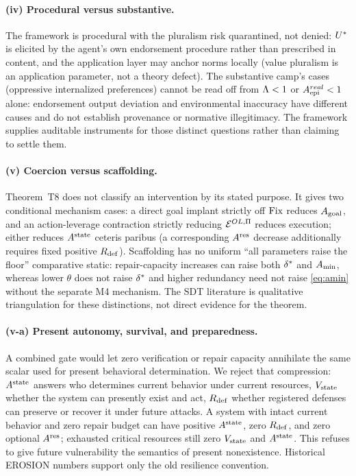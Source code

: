 \paragraph{(iv) Procedural versus substantive.} The framework is procedural
with the pluralism risk quarantined, not denied: $U^{*}$ is elicited by the
agent's own endorsement procedure rather than prescribed in content, and the
application layer may anchor norms locally (value pluralism
\citep{gabriel2020} is an application parameter, not a theory defect). The
substantive camp's cases (oppressive internalized preferences) cannot be read
off from $\Lambda<1$ or $A_{\mathrm{epi}}^{real}<1$ alone: endorsement output deviation and
environmental inaccuracy have different causes and do not establish
provenance or normative illegitimacy. The framework supplies auditable
instruments for those distinct questions rather than claiming to settle them.

\paragraph{(v) Coercion versus scaffolding.} Theorem~T8 does not classify an
intervention by its stated purpose. It gives two conditional mechanism
cases: a direct goal implant strictly off $\mathrm{Fix}$ reduces $A_{\mathrm{goal}}$, and an
action-leverage contraction strictly reducing $\mathcal{E}^{OL,\Pi}$ reduces execution;
either reduces $A^{\mathrm{state}}$ ceteris paribus (a corresponding $A^{\mathrm{res}}$ decrease
additionally requires fixed positive $R_{\mathrm{def}}$). Scaffolding has no uniform
``all parameters raise the floor'' comparative static: repair-capacity
increases can raise both $\delta^{*}$ and $A_{\min}$, whereas lower $\theta$
does not raise $\delta^{*}$ and higher redundancy need not raise
\eqref{eq:amin} without the separate M4 mechanism. The SDT literature
\citep{ryan_deci2000} is qualitative triangulation for these distinctions,
not direct evidence for the theorem.

\paragraph{(v-a) Present autonomy, survival, and preparedness.}
A combined gate would let zero verification or repair capacity annihilate the
same scalar used for present behavioral determination. We reject that
compression: $A^{\mathrm{state}}$ answers who determines current behavior under current
resources, $V_{\mathrm{state}}$ whether the system can presently exist and act, $R_{\mathrm{def}}$
whether registered defenses can preserve or recover it under future attacks.
A system with intact current behavior and zero repair budget can have
positive $A^{\mathrm{state}}$, zero $R_{\mathrm{def}}$, and zero optional $A^{\mathrm{res}}$; exhausted
critical resources still zero $V_{\mathrm{state}}$ and $A^{\mathrm{state}}$. This refuses to give
future vulnerability the semantics of present nonexistence. Historical
EROSION numbers support only the old resilience convention.

